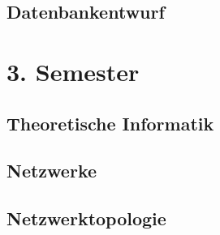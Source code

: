 \documentclass[10pt,a4paper]{article}
\begin{document}
\subsection{Datenbankentwurf}

\newpage

\section{3. Semester}

\subsection{Theoretische Informatik}
\subsection{Netzwerke}

\subsection{Netzwerktopologie}
\end{document}
